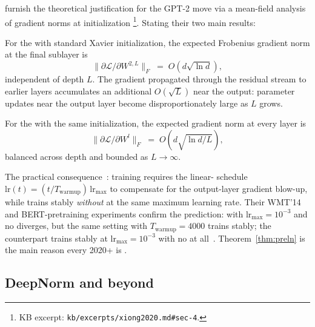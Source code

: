 \citet{xiong2020} furnish the theoretical justification for the GPT-2
move via a mean-field analysis of gradient norms at
initialization%
\footnote{KB excerpt: \nolinkurl{kb/excerpts/xiong2020.md#sec-4}.}.
Stating their two main results:
\begin{theorem}
\label{thm:postln}
For the   with standard Xavier initialization, the
expected Frobenius gradient norm at the final  sublayer is
\[
  \|\partial \mathcal{L} / \partial W^{2,L}\|_F
  \;=\; O\!\left( d \sqrt{\ln d} \right),
\]
independent of depth $L$. The gradient propagated through the residual
stream to earlier layers accumulates an additional $O(\sqrt{L})$ near
the output: parameter updates near the output layer become
disproportionately large as $L$ grows.
\end{theorem}
\begin{theorem}
\label{thm:preln}
For the   with the same initialization, the expected
gradient norm at every layer is
\[
  \|\partial \mathcal{L} / \partial W^{l}\|_F
  \;=\; O\!\left( d \sqrt{\ln d / L} \right),
\]
balanced across depth and bounded as $L \to \infty$.
\end{theorem}
The practical consequence~\citep[\S 4.1, \S 5]{xiong2020}: 
training requires the linear- schedule
$\mathrm{lr}(t) = (t/T_{\mathrm{warmup}})\,\mathrm{lr}_{\max}$ to
compensate for the output-layer gradient blow-up, while  trains
stably \emph{without } at the same maximum learning rate. Their
WMT'14 and BERT-pretraining experiments confirm the prediction:
 with $\mathrm{lr}_{\max} = 10^{-3}$ and no  diverges, but
the same setting with $T_{\mathrm{warmup}} = 4000$ trains stably; the
 counterpart trains stably at $\mathrm{lr}_{\max} = 10^{-3}$ with
no  at all~\citep[\S 5]{xiong2020}. Theorem~\ref{thm:preln} is the
main reason every 2020+   is .

\subsection{DeepNorm and beyond}
\label{sec:norm-deepnorm}

